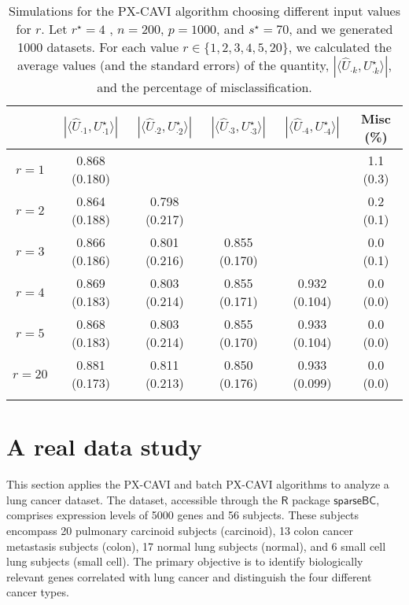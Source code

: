\documentclass[pdftex, noinfoline, letter]{imsart}
\theoremstyle{plain}
\begin{document}
\begin{table}[h!]
\centering
\caption{\small Simulations for the PX-CAVI algorithm choosing different input values for $r$. Let $r^\star = 4$ , $n = 200$, $p = 1000$, and $s^\star = 70$, and we generated 1000 datasets. For each value $r \in \{1, 2, 3, 4, 5, 20\}$, we calculated the average values (and the standard errors) of the quantity, $|\langle \widehat  U_{\cdot k}, U_{\cdot k}^\star \rangle|$,
and the percentage of misclassification.}
\label{sim-4}
{ \small
\begin{tabular}{cccccc}
\Xhline{2\arrayrulewidth}
   & $|\langle \widehat  U_{\cdot 1}, U_{\cdot 1}^\star \rangle|$ 
   & $|\langle \widehat  U_{\cdot 2}, U_{\cdot 2}^\star \rangle|$ 
   & $|\langle \widehat  U_{\cdot 3}, U_{\cdot 3}^\star \rangle|$ 
   & $|\langle \widehat  U_{\cdot 4}, U_{\cdot 4}^\star \rangle|$ 
   & Misc (\%)\\
\hline
   $r = 1$  & 0.868 (0.180) &  &  & & 1.1 (0.3) \\
   $r = 2$  & 0.864 (0.188) & 0.798 (0.217) & & & 0.2 (0.1) \\
   $r = 3$  & 0.866 (0.186) & 0.801 (0.216) & 0.855 (0.170) & & 0.0 (0.1) \\
   $r = 4$  & 0.869 (0.183) & 0.803 (0.214) & 0.855 (0.171) & 0.932 (0.104) & 0.0 (0.0) \\
   $r = 5$  & 0.868 (0.183) & 0.803 (0.214) & 0.855 (0.170) & 0.933 (0.104) & 0.0 (0.0) \\
   $r = 20$ & 0.881 (0.173) & 0.811 (0.213) & 0.850 (0.176) & 0.933 (0.099) & 0.0 (0.0) \\
\Xhline{2\arrayrulewidth}
\end{tabular}    
}
\end{table}

\section{A real data study}
\label{sec:realstudy}

This section applies the PX-CAVI and batch PX-CAVI algorithms to analyze a lung cancer dataset. The dataset, accessible through the $\mathsf{R}$ package $\mathsf{sparseBC}$, comprises expression levels of 5000 genes and 56 subjects. These subjects encompass 20 pulmonary carcinoid subjects (carcinoid), 13 colon cancer metastasis subjects (colon), 17 normal lung subjects (normal), and 6 small cell lung subjects (small cell). The primary objective is to identify biologically relevant genes correlated with lung cancer and distinguish the four different cancer types.
\end{document}
